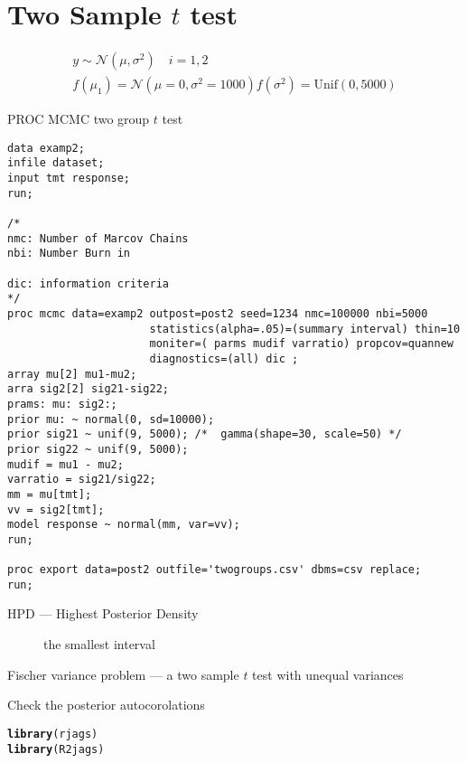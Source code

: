 \documentclass[12pt,letterpaper,oneside]{article}\usepackage{graphicx, color}
\makeatletter
\newcommand{\hlfunctioncall}[1]{\textcolor[rgb]{0.501960784313725,0,0.329411764705882}{\textbf{#1}}}%
\newenvironment{kframe}{%
 \def\at@end@of@kframe{}%
 \ifinner\ifhmode%
  \def\at@end@of@kframe{\end{minipage}}%
  \begin{minipage}{\columnwidth}%
 \fi\fi%
 \def\FrameCommand##1{\hskip\@totalleftmargin \hskip-\fboxsep
 \colorbox{shadecolor}{##1}\hskip-\fboxsep
     \hskip-\linewidth \hskip-\@totalleftmargin \hskip\columnwidth}%
 \MakeFramed {\advance\hsize-\width
   \@totalleftmargin\z@ \linewidth\hsize
   \@setminipage}}%
 {\par\unskip\endMakeFramed%
 \at@end@of@kframe}
\newenvironment{knitrout}{}{} %
\newcommand{\dateTaken}{January 7, 2013}
\makeatother
\begin{document}
\section{Two Sample $t$ test} %
\label{sec:two_sample_t_test}

\begin{align*}
y \sim \mathcal{N}(\mu, \sigma^2)\quad i=1,2\\
f(\mu_1)=\mathcal{N}(\mu=0, \sigma^2=1000)
f(\sigma^2)=\text{Unif}(0, 5000)
\end{align*}

PROC MCMC two group $t$ test
\begin{lstlisting}[language=SAS]
data examp2;
infile dataset;
input tmt response;
run;

/*
nmc: Number of Marcov Chains
nbi: Number Burn in

dic: information criteria
*/
proc mcmc data=examp2 outpost=post2 seed=1234 nmc=100000 nbi=5000
                      statistics(alpha=.05)=(summary interval) thin=10
                      moniter=( parms mudif varratio) propcov=quannew
                      diagnostics=(all) dic ;
array mu[2] mu1-mu2;
arra sig2[2] sig21-sig22;
prams: mu: sig2:;
prior mu: ~ normal(0, sd=10000);
prior sig21 ~ unif(9, 5000); /*  gamma(shape=30, scale=50) */
prior sig22 ~ unif(9, 5000);
mudif = mu1 - mu2;
varratio = sig21/sig22;
mm = mu[tmt];
vv = sig2[tmt];
model response ~ normal(mm, var=vv);
run;

proc export data=post2 outfile='twogroups.csv' dbms=csv replace;
run;
\end{lstlisting}

\begin{description}
    \item[HPD --- Highest Posterior Density] the smallest interval
\end{description}

Fischer variance problem --- a two sample $t$ test with unequal variances



Check the posterior autocorolations

\renewcommand{\dateTaken}{January 15, 2013}
\daysep
\begin{knitrout}\scriptsize
{}\color{fgcolor}\begin{kframe}
\begin{alltt}
\hlfunctioncall{library}(rjags)
\hlfunctioncall{library}(R2jags)
\end{alltt}
\end{kframe}
\end{knitrout}
\end{document}
